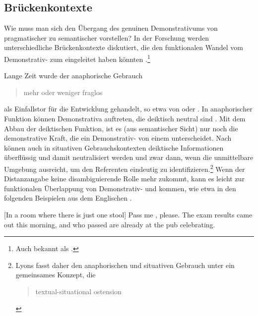 \subsection{Brückenkontexte} \label{sec:bruecke}

Wie muss man sich den Übergang des genuinen Demonstrativums  von pragmatischer  zu semantischer    vorstellen? In der Forschung werden unterschiedliche Brückenkontexte  \parencite{Heine2002} diskutiert, die den funktionalen Wandel vom Demonstrativ-  zum  eingeleitet haben könnten \parencite[zur Übersicht s.][526--528]{deMulder2011}.\footnote{Auch bekannt als  \parencite{Diewald2002}.}

Lange Zeit wurde der anaphorische  Gebrauch  \blockcquote[93]{Himmelmann1997}{mehr oder weniger fraglos} als Einfallstor für die Entwicklung gehandelt, so etwa von  \textcite{Oubouzar1989,Oubouzar1992} oder \textcite{Diessel1999}. In anaphorischer  Funktion können Demonstrativa  auftreten, die deiktisch neutral sind \parencite[41]{Lehmann2015}. Mit dem Abbau der deiktischen Funktion, ist es (aus semantischer Sicht) nur noch die demonstrative Kraft, die ein Demonstrativ-  von einem  unterscheidet. Nach \textcite[331--334]{Lyons1999} können auch in situativen  Gebrauchskontexten deiktische Informationen überflüssig und damit neutralisiert werden und zwar dann, wenn die unmittelbare Umgebung ausreicht, um den Referenten eindeutig zu identifizieren.\footnote{Lyons fasst daher den anaphorischen  und situativen  Gebrauch unter ein gemeinsames Konzept, die  \blockcquote[161]{Lyons1999}{textual-situational ostension}.} Wenn der Distanzangabe keine disambiguierende Rolle mehr zukommt, kann es leicht zur funktionalen Überlappung von Demonstrativ-  und  kommen, wie etwa in den folgenden Beispielen aus dem Englischen \parencite[164]{Lyons1999}. 


 \begin{exe}
	\ex 
	\begin{xlist} \label{ex:lyons}
		\ex \label{ex:lyons-sit}  [In a room where there is just one stool] Pass me , please.  
		\ex \label{ex:lyons-ana} The exam results came out this morning, and  who passed are already at the pub celebrating.  
		\end{xlist}
\end{exe}

